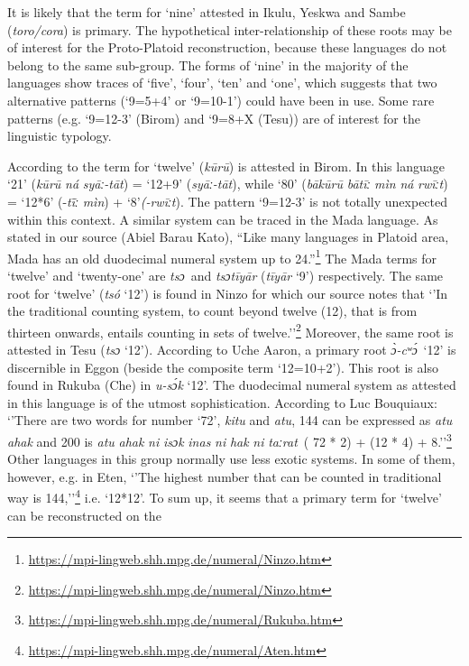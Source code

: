 \clearpage 
It is likely that the term for ‘nine’ attested in Ikulu, Yeskwa and Sambe (\textit{toro/cora}) is primary. The hypothetical inter-relationship of these roots may be of interest for the Proto-Platoid reconstruction, because these languages do not belong to the same sub-group. The forms of ‘nine’ in the majority of the languages show traces of ‘five’, ‘four’, ‘ten’ and ‘one’, which suggests that two alternative patterns (‘9=5+4’ or ‘9=10-1’) could have been in use. Some rare patterns (e.g. ‘9=12-3’ (Birom) and ‘9=8+X (Tesu)) are of interest for the linguistic typology.

According to \citet{Bouquiaux1962} the term for ‘twelve’ (\textit{k{\={u}}r{\={u}}}) is attested in Birom.  In this language ‘21’ (\textit{k{\={u}}r{\={u}}} \textit{ná} \textit{syāː-tāt}) = ‘12+9’ (\textit{syāː-tāt}), while ‘80’ (\textit{bāk{\={u}}r{\={u}}} \textit{bātīː} \textit{mìn} \textit{ná} \textit{rwīːt}) = ‘12*6’ (-\textit{t{\=ī}ː} \textit{mìn}) + ‘8’\textit{(-rwīːt}). The pattern ‘9=12-3’ is not totally unexpected within this context. A similar system can be traced in the Mada language. As stated in our source (Abiel Barau Kato), “Like many languages in Platoid area, Mada has an old duodecimal numeral system up to 24.”\footnote{\href{https://mpi-lingweb.shh.mpg.de/numeral/Ninzo.htm}{https://mpi-lingweb.shh.mpg.de/numeral/Ninzo}\href{https://mpi-lingweb.shh.mpg.de/numeral/Ninzo.htm}{.htm}} The Mada terms for ‘twelve’ and ‘twenty-one’ are \textit{tsɔ}~and \textit{tsɔtīyār} (\textit{tīyār} ‘9’) respectively. The same root for ‘twelve’ (\textit{tsó} ‘12’) is found in Ninzo for which our source notes that ‘’In the traditional counting system, to count beyond twelve (12), that is from thirteen onwards, entails counting in sets of twelve.’’\footnote{\href{https://mpi-lingweb.shh.mpg.de/numeral/Ninzo.htm}{https://mpi-lingweb.shh.mpg.de/numeral/Ninzo}\href{https://mpi-lingweb.shh.mpg.de/numeral/Ninzo.htm}{.htm}} Moreover, the same root is attested in Tesu (\textit{tsɔ} ‘12’). According to Uche Aaron, a primary root \textit{{\`{ɔ}}-cʷ{\'{ɔ}}}~‘12’ is discernible in Eggon (beside the composite term ‘12=10+2’). This root is also found in Rukuba (Che) in \textit{u-s{\'{ɔ}}k} ‘12’. The duodecimal numeral system as attested in this language is of the utmost sophistication. According to Luc Bouquiaux: ‘’There are two words for number `72', \textit{kitu} and \textit{atu}, 144 can be expressed as \textit{atu} \textit{ahak} and 200 is \textit{atu} \textit{ahak} \textit{ni} \textit{isɔk} \textit{inas} \textit{ni} \textit{hak} \textit{ni} \textit{taːrat}~( 72 * 2) + (12 * 4) + 8.’’\footnote{\href{https://mpi-lingweb.shh.mpg.de/numeral/Rukuba.htm}{https://mpi-lingweb.shh.mpg.de/numeral/Rukuba}\href{https://mpi-lingweb.shh.mpg.de/numeral/Rukuba.htm}{.htm}} Other languages in this group normally use less exotic systems. In some of them, however, e.g. in Eten, ‘’The highest number that can be counted in traditional way is 144,’’\footnote{\url{https://mpi-lingweb.shh.mpg.de/numeral/Aten.htm}} i.e. ‘12*12’. To sum up, it seems that a primary term for ‘twelve’ can be reconstructed on the 
